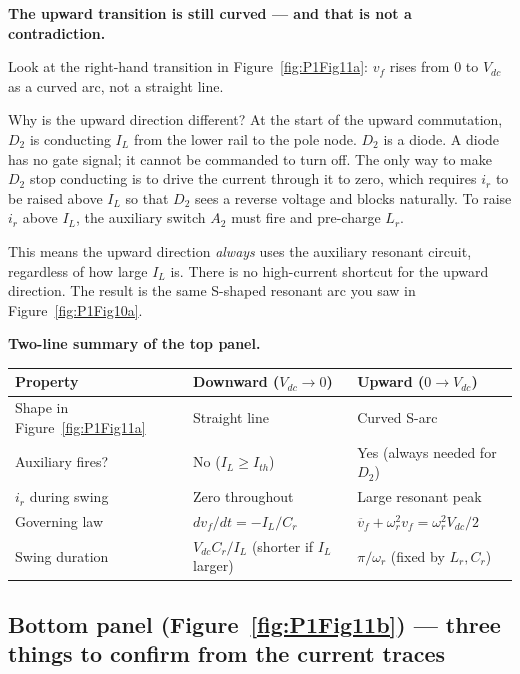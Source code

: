 \documentclass[12pt, a4paper]{article}
\newcommand{\Vdc}{V_{dc}}
\newcommand{\vf}{v_f}
\newcommand{\ir}{i_r}
\newcommand{\IL}{I_L}
\newcommand{\Lr}{L_r}
\newcommand{\Cr}{C_r}
\newcommand{\omegar}{\omega_r}
\newcommand{\Ith}{I_{th}}
\newcommand{\figref}[1]{Figure~\ref{#1}}
\begin{document}
\medskip
\textbf{The upward transition is still curved --- and that is not a
contradiction.}

Look at the right-hand transition in \figref{fig:P1Fig11a}: $\vf$ rises
from $0$ to $\Vdc$ as a curved arc, not a straight line.

Why is the upward direction different?
At the start of the upward commutation, $D_2$ is conducting $\IL$ from the
lower rail to the pole node.
$D_2$ is a diode.
A diode has no gate signal; it cannot be commanded to turn off.
The only way to make $D_2$ stop conducting is to drive the current through
it to zero, which requires $\ir$ to be raised above $\IL$ so that
$D_2$ sees a reverse voltage and blocks naturally.
To raise $\ir$ above $\IL$, the auxiliary switch $A_2$ must fire and
pre-charge $\Lr$.

This means the upward direction \emph{always} uses the auxiliary resonant
circuit, regardless of how large $\IL$ is.
There is no high-current shortcut for the upward direction.
The result is the same S-shaped resonant arc you saw in \figref{fig:P1Fig10a}.

\medskip
\textbf{Two-line summary of the top panel.}

\begin{center}
\renewcommand{\arraystretch}{1.3}
\begin{tabular}{p{3.5cm} p{4.7cm} p{4.7cm}}
\toprule
\textbf{Property}
    & \textbf{Downward ($\Vdc \to 0$)}
    & \textbf{Upward ($0 \to \Vdc$)} \\
\midrule
Shape in \figref{fig:P1Fig11a}
    & Straight line
    & Curved S-arc \\
Auxiliary fires?
    & No ($\IL \geq \Ith$)
    & Yes (always needed for $D_2$) \\
$\ir$ during swing
    & Zero throughout
    & Large resonant peak \\
Governing law
    & $d\vf/dt = -\IL/\Cr$
    & $\ddot{\vf}+\omegar^2\vf = \omegar^2\Vdc/2$ \\
Swing duration
    & $\Vdc\Cr/\IL$ (shorter if $\IL$ larger)
    & $\pi/\omegar$ (fixed by $\Lr, \Cr$) \\
\bottomrule
\end{tabular}
\end{center}

\subsection*{Bottom panel (\figref{fig:P1Fig11b}) --- three things to
confirm from the current traces}
\end{document}
